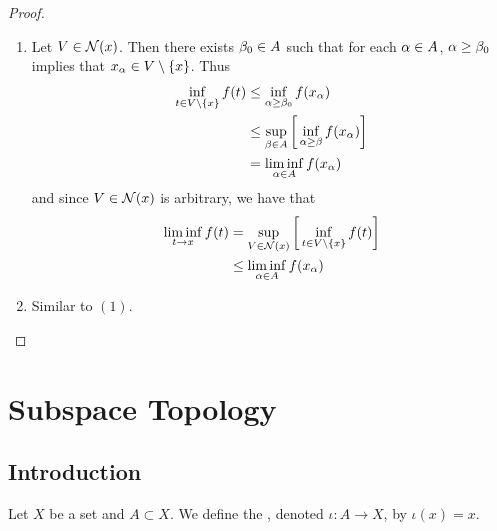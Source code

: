 \documentclass{book}
\begin{document}
	\begin{proof}\
		\begin{enumerate}
			\item Let $V \in \mathcal{N}(x)$. Then there exists $\beta_0 \in A$ such that for each $\alpha \in A$, $\alpha \geq \beta_0$ implies that $x_{\alpha} \in V \setminus \{x\}$. Thus 
			\begin{align*}
				\inf_{t \in V \setminus \{x\}} f(t) 
				& \leq \inf_{\alpha \geq \beta_0}f(x_{\alpha}) \\
				& \leq \sup_{\beta \in A} \bigg[ \inf_{\alpha \geq \beta} f(x_{\alpha}) \bigg] \\
				& = \liminf_{\alpha \in A} f(x_{\alpha})
			\end{align*}
			and since $V \in \mathcal{N}(x)$ is arbitrary, we have that
			\begin{align*}
				\liminf_{t \rightarrow x} f(t) 
				&= \sup_{V \in \mathcal{N}(x)} \bigg[ \inf_{t \in V \setminus \{x\}} f(t) \bigg] \\
				& \leq \liminf_{\alpha \in A} f(x_{\alpha})
			\end{align*} 
			\item Similar to $(1)$.
		\end{enumerate}
	\end{proof}































\newpage
\section{Subspace Topology}

\subsection{Introduction}

\begin{defn} 
	Let $X$ be a set and $A \subset X$. We define the , denoted $\iota: A \rightarrow X$, by $\iota(x) = x$. 
\end{defn}
\end{document}
